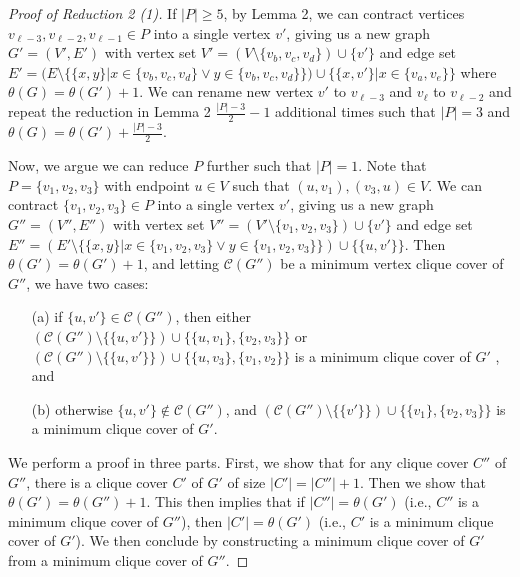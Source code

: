 \documentclass[../techreport.tex]{subfiles}
\begin{document}
\begin{proof}[Proof of Reduction 2 (1)]

	If $|P| \geq 5$, by Lemma 2, we can contract vertices $v_{\ell - 3}, v_{\ell - 2}, v_{\ell - 1} \in P$ into a single vertex $v'$, giving us a new graph $G' = (V', E')$ with vertex set $V' = (V \setminus \{v_b, v_c, v_d\}) \cup \{v'\}$ and edge set $E' = (E \setminus \{\{x, y\}| x \in \{v_b, v_c, v_d\} \lor y \in \{v_b, v_c, v_d\}\}) \cup \{\{x, v'\}| x \in \{v_a, v_e\}\}$ where $\theta(G) = \theta(G') + 1$. We can rename new vertex $v'$ to $v_{\ell - 3}$ and $v_{\ell}$ to $v_{\ell - 2}$ and repeat the reduction in Lemma 2 $\frac{|P| - 3}{2} - 1$ additional times such that $|P| = 3$ and $\theta(G) = \theta(G') + \frac{|P| - 3}{2}$.

	Now, we argue we can reduce $P$ further such that $|P| = 1$. Note that $P = \{v_1, v_2, v_3\}$ with endpoint $u \in V$ such that $(u, v_1), (v_3, u) \in V$. We can contract $\{v_1, v_2, v_3\} \in P$ into a single vertex $v'$, giving us a new graph $G'' = (V'', E'')$ with vertex set $V'' = (V' \setminus \{v_1, v_2, v_3\}) \cup \{v'\}$ and edge set $E'' = (E' \setminus \{\{x, y\}| x \in \{v_1, v_2, v_3\} \lor y \in \{v_1, v_2, v_3\}\}) \cup \{\{u, v'\}\}$. Then $\theta(G') = \theta(G') + 1$, and letting $\mathcal{C}(G'')$ be a minimum vertex clique cover of $G''$, we have two cases:
	\begin{itemize}
		\item[(a)] if $\{u, v'\} \in \mathcal{C}(G'')$, then either $(\mathcal{C}(G'') \setminus \{\{u, v'\}\}) \cup \{\{u, v_1\}, \{v_2, v_3\}\}$ or $(\mathcal{C}(G'') \setminus \{\{u, v'\}\}) \cup \{\{u, v_3\}, \{v_1, v_2\}\}$ is a minimum clique cover of $G'$ , and

		\item[(b)] otherwise $\{u, v'\} \notin \mathcal{C}(G'')$, and $(\mathcal{C}(G'') \setminus \{\{v'\}\}) \cup \{\{v_1\}, \{v_2, v_3\}\}$ is a minimum clique cover of $G'$.
	\end{itemize}

	\newtheorem{claim3}{Claim}

	We perform a proof in three parts. First, we show that for any clique cover $C''$ of $G''$, there is a clique cover $C'$ of $G'$ of size $|C'| = |C''| + 1$. Then we show that $\theta(G') = \theta(G'') + 1$. This then implies that if $|C''| = \theta(G')$ (i.e., $C''$ is a minimum clique cover of $G''$), then $|C'| = \theta(G')$ (i.e., $C'$ is a minimum clique cover of $G'$). We then conclude by constructing a minimum clique cover of $G'$ from a minimum clique cover of $G''$.


\end{proof}
\end{document}
